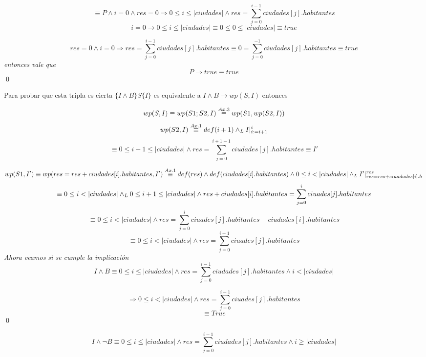 \documentclass[10pt,a4paper]{article}
\begin{document}
\begin{demoPc}
		\begin{demo1}
			\[ 
			\equiv P \land i=0\land res=0 \Longrightarrow 0 \leq i \leq |ciudades| \land res=\sum_{j=0}^{i-1}ciudades[j].habitantes
			\]
			\[i=0 \to 0 \leq i \leq |ciudades| \equiv 0 \leq 0 \leq |ciudades| \equiv true\]
			
			\[res=0 \land i=0\Longrightarrow res= \sum_{j=0}^{i-1} ciudades[j].habitantes \equiv 0 = \sum_{j=0}^{-1} ciudades[j].habitantes \equiv true \]
			\textit{entonces vale que}
			\[P \Longrightarrow true \equiv true \]
			\qed \\
			
		\end{demo1}
		
		
		\begin{demo2}
			Para probar que esta tripla es cierta $\{I \land B\}S\{I\}$  es equivalente a $I \land B \to wp(S,I)$ entonces\par
			\[
			wp(S,I) \equiv wp(S1;S2,I) \overset{\scriptsize Ax. 3}{\equiv}wp(S1,wp(S2,I))
			\]
			\[ 	wp(S2,I) \overset{\scriptsize Ax. 1}{\equiv} def(i+1) \land _L I|_{i:=i+1}^{i}
			\]	
			\[ \equiv 0\leq i+1 \leq |ciudades| \land res=\sum_{j=0}^{i+1-1} ciudades[j].habitantes  \equiv I' \]\par
			
			\[wp(S1,I') \equiv wp(res=res+ciudades[i].habitantes,I')\overset{\scriptsize Ax. 1}{\equiv} def(res) \land def(ciudades[i].habitantes) \land 0 \leq i < |ciudades| \land _L I'|_{res=res+ciuadades[i].h}^{res}\]
			\[
			\equiv 0 \leq i <|ciudades| \yLuego 0\leq i+1 \leq |ciudades|\land res+ ciudades[i].habitantes=\sum_{j=0}^{i} ciuades[j].habitantes
			\]
			\[\equiv 0 \leq i < |ciudades| \land res=\sum_{j=0}^{i} ciuades[j].habitantes -ciudades[i].habitantes \]
			\[
			\boxed{	\equiv 0 \leq i < |ciudades| \land res=\sum_{j=0}^{i-1} ciuades[j].habitantes }
			\]
			\textit{Ahora veamos si se cumple la implicación}
			\[
			I \land B \equiv 0 \leq i \leq |ciudades| \land res= \sum_{j=0}^{i-1} ciudades[j].habitantes \land  i < \lvert ciudades \rvert 
			\]
			
			\[ \Longrightarrow 0 \leq i < |ciudades| \land res=\sum_{j=0}^{i-1} ciuades[j].habitantes \]
			\[\equiv True\]
			\qed 
			
		\end{demo2}
		\begin{demo3}
			\[
			I \land \neg B \equiv 0 \leq i \leq \lvert ciudades\rvert \land  res=  \sum_{j=0}^{i-1} ciudades[j].habitantes \land i \geq |ciudades| 
			\]
			

\end{demo3}
\end{demoPc}
\end{document}
